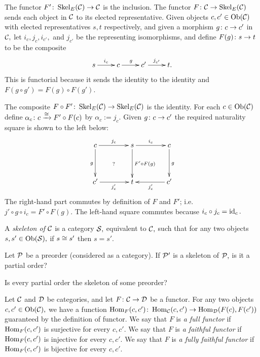 \documentclass[../main/CT4S-EN-RU]{subfiles}
\begin{document}
\begin{proofENG}
The functor $F'\colon\operatorname{Skel}_E(\mathcal{C})\rightarrow\mathcal{C}$ is the inclusion. The functor $F\colon\mathcal{C}\rightarrow\operatorname{Skel}_E(\mathcal{C})$ sends each object in $\mathcal{C}$ to its elected representative. Given objects $c,c'\in\operatorname{Ob}(\mathcal{C})$ with elected representatives $s,t$ respectively, and given a morphism $g\colon c\rightarrow c'$ in $\mathcal{C},$ let $i_c,j_c,i_{c'},$ and $j_{c'}$ be the representing isomorphisms, and define $F(g)\colon s\rightarrow t$ to be the composite 
$$\xymatrix{s\ar[r]^{i_c}&c\ar[r]^g&c'\ar[r]^{j_{c'}}&t.}$$
This is functorial because it sends the identity to the identity and $F(g\circ g')=F(g)\circ F(g').$

The composite $F\circ F'\colon\operatorname{Skel}_E(\mathcal{C})\rightarrow\operatorname{Skel}_E(\mathcal{C})$ is the identity. For each $c\in\operatorname{Ob}(\mathcal{C})$ define $\alpha_c\colon c\xrightarrow{\cong} F'\circ F(c)$ by  $\alpha_c:=j_c.$ Given $g\colon c\rightarrow c'$ the required naturality square is shown to the left below:
$$
\xymatrix@=40pt{
c\ar[r]^{j_c}\ar[d]_{g}\ar@{}[dr]|{?}&s\ar[r]^{i_c}\ar[d]^{F'\circ F(g)}&c\ar[d]^g\\
c'\ar[r]_{j_c'}&t&c'\ar[l]^{j_c'}}
$$
The right-hand part commutes by definition of $F$ and $F'$; i.e. $j'\circ g\circ i_c=F'\circ F(g).$ The left-hand square commutes because $i_c\circ j_c=\operatorname{id}_c.$
\end{proofENG}

\begin{proofRUS}
\end{proofRUS}

\begin{definitionENG}
A {\em skeleton of $\mathcal{C}$} is a category $\mathcal{S},$ equivalent to $\mathcal{C},$ such that for any two objects $s,s'\in\operatorname{Ob}(\mathcal{S}),$ if $s\cong s'$ then $s=s'.$ 
\end{definitionENG}

\begin{definitionRUS}
\end{definitionRUS}

\begin{exerciseENG}
Let $\mathcal{P}$ be a preorder (considered as a category).
\sexc If $\mathcal{P}'$ is a skeleton of $\mathcal{P},$ is it a partial order?
\item Is every partial order the skeleton of some preorder?
\endsexc
\end{exerciseENG}

\begin{exerciseRUS}
\end{exerciseRUS}

\begin{definitionENG}\label{def:full faithful}
Let $\mathcal{C}$ and $\mathcal{D}$ be categories, and let $F\colon\mathcal{C}\rightarrow\mathcal{D}$ be a functor. For any two objects $c,c'\in\operatorname{Ob}(\mathcal{C}),$ we have a function $\operatorname{Hom}_F(c,c')\colon\operatorname{Hom}_\mathcal{C}(c,c')\rightarrow\operatorname{Hom}_\mathcal{D}(F(c),F(c'))$ guaranteed by the definition of functor.
We say that $F$ is {\em a full functor} if $\operatorname{Hom}_F(c,c')$ is surjective for every $c,c'.$
We say that $F$ is {\em a faithful functor} if $\operatorname{Hom}_F(c,c')$ is injective for every $c,c'.$ We say that $F$ is {\em a fully faithful functor} if $\operatorname{Hom}_F(c,c')$ is bijective for every $c,c'.$
\end{definitionENG}
\end{document}

